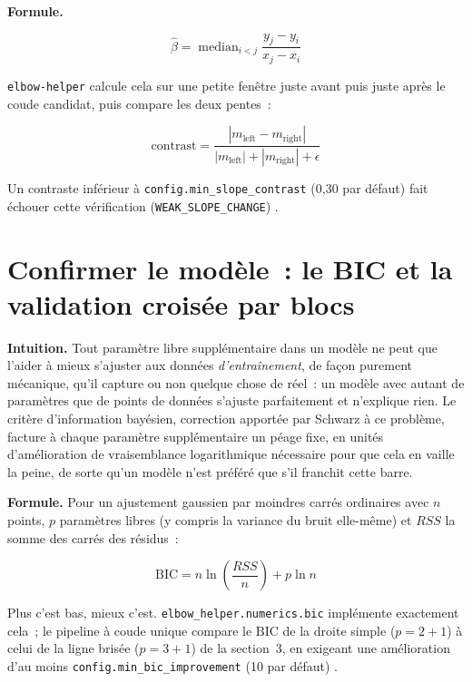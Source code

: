 \documentclass[11pt]{article}
\newcommand{\code}[1]{\texttt{#1}}
\begin{document}
\textbf{Formule.}

\begin{equation}
\hat\beta = \operatorname{median}_{i < j} \frac{y_j - y_i}{x_j - x_i}
\end{equation}

\code{elbow-helper} calcule cela sur une petite fenêtre juste avant puis
juste après le coude candidat, puis compare les deux pentes~:

\begin{equation}
\text{contrast} = \frac{|m_{\text{left}} - m_{\text{right}}|}{|m_{\text{left}}| + |m_{\text{right}}| + \epsilon}
\end{equation}

Un contraste inférieur à \code{config.min\_slope\_contrast} (0,30 par
défaut) fait échouer cette vérification (\code{WEAK\_SLOPE\_CHANGE})
\citep{theil1950} \citep{sen1968}.

\section{Confirmer le modèle~: le BIC et la validation croisée par blocs}
\label{sec:bic-vc}

\textbf{Intuition.} Tout paramètre libre supplémentaire dans un modèle ne
peut que l'aider à mieux s'ajuster aux données \emph{d'entraînement}, de
façon purement mécanique, qu'il capture ou non quelque chose de réel~: un
modèle avec autant de paramètres que de points de données s'ajuste
parfaitement et n'explique rien. Le critère d'information bayésien,
correction apportée par Schwarz à ce problème, facture à chaque paramètre
supplémentaire un péage fixe, en unités d'amélioration de vraisemblance
logarithmique nécessaire pour que cela en vaille la peine, de sorte qu'un
modèle n'est préféré que s'il franchit cette barre.

\textbf{Formule.} Pour un ajustement gaussien par moindres carrés
ordinaires avec $n$ points, $p$ paramètres libres (y compris la variance du
bruit elle-même) et $RSS$ la somme des carrés des résidus~:

\begin{equation}
\mathrm{BIC} = n \ln\!\left(\frac{RSS}{n}\right) + p \ln n
\end{equation}

Plus c'est bas, mieux c'est. \code{elbow\_helper.numerics.bic} implémente
exactement cela~; le pipeline à coude unique compare le $\mathrm{BIC}$ de
la droite simple ($p = 2 + 1$) à celui de la ligne brisée ($p = 3 + 1$) de
la section~3, en exigeant une amélioration d'au moins
\code{config.min\_bic\_improvement} (10 par défaut) \citep{schwarz1978}
\citep{hastie2009esl} \citep{bishop2006prml}.
\end{document}
